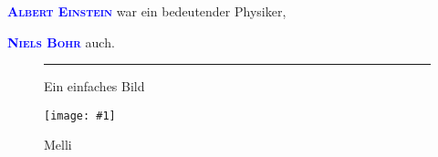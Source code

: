 \documentclass[12pt,ngerman]{scrartcl}
\newcommand{\person}[1]{\textcolor{red}{\textsc{\bfseries #1}}}
\renewcommand{\person}[1]{\textcolor{blue}{\textsc{\bfseries #1}}}
\newcommand{\bild}{\textcolor{lime}{\rule{8cm}{6cm}}}
\newcommand{\image}[2]{%
\begin{figure}
\centering
\texttt{[image: \#1]}
\caption{#2}\label{fig:#1}
\end{figure}
}
\begin{document}
\person{Albert Einstein} war ein bedeutender Physiker,

\person{Niels Bohr} auch.

\begin{figure}
\centering
\bild
\caption{Ein einfaches Bild}
\end{figure}


\image{Katze}{Melli}

\pageref{fig:Katze}
\end{document}
